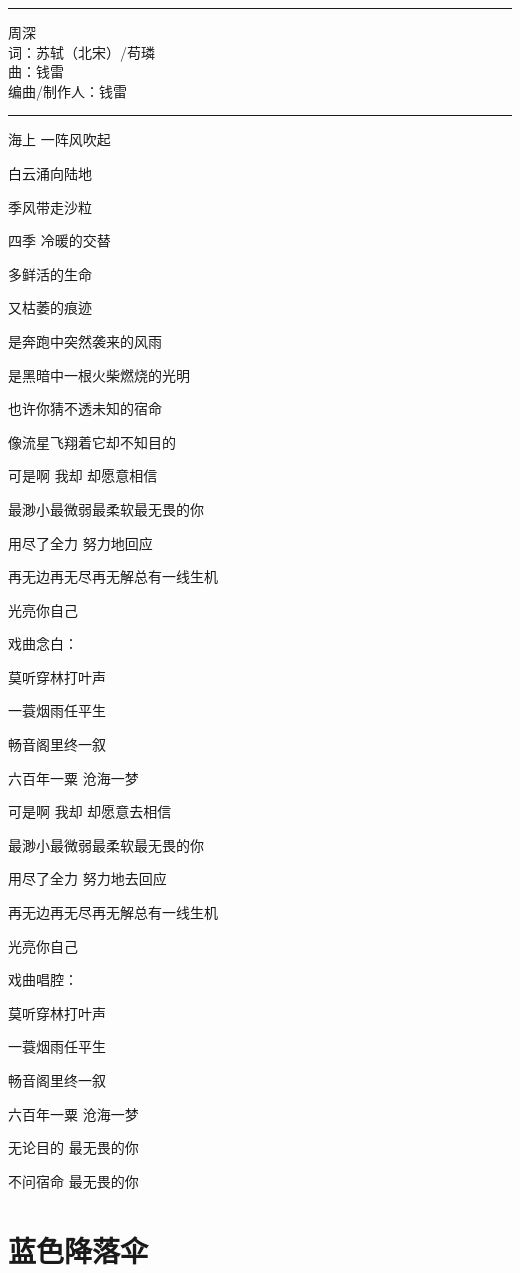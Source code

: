 \documentclass[]{ctexbook}
\begin{document}
\begin{center}\rule{0.5\linewidth}{0.5pt}\end{center}

周深\\
词：苏轼（北宋）/苟璘\\
曲：钱雷\\
编曲/制作人：钱雷

\begin{center}\rule{0.5\linewidth}{0.5pt}\end{center}

海上 一阵风吹起

白云涌向陆地

季风带走沙粒

四季 冷暖的交替

多鲜活的生命

又枯萎的痕迹

是奔跑中突然袭来的风雨

是黑暗中一根火柴燃烧的光明

也许你猜不透未知的宿命

像流星飞翔着它却不知目的

可是啊 我却 却愿意相信

最渺小最微弱最柔软最无畏的你

用尽了全力 努力地回应

再无边再无尽再无解总有一线生机

光亮你自己

戏曲念白：

莫听穿林打叶声

一蓑烟雨任平生

畅音阁里终一叙

六百年一粟 沧海一梦

可是啊 我却 却愿意去相信

最渺小最微弱最柔软最无畏的你

用尽了全力 努力地去回应

再无边再无尽再无解总有一线生机

光亮你自己

戏曲唱腔：

莫听穿林打叶声

一蓑烟雨任平生

畅音阁里终一叙

六百年一粟 沧海一梦

无论目的 最无畏的你

不问宿命 最无畏的你

\section*{蓝色降落伞}\label{blue-parachute}
\end{document}
